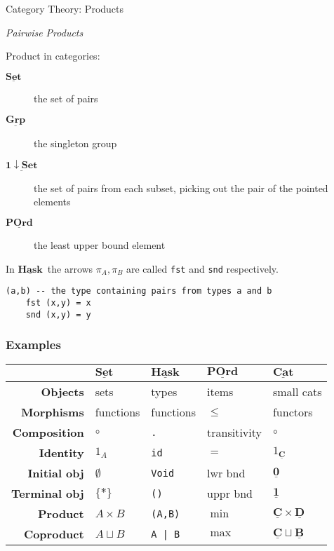 \documentclass[10pt]{beamer}
\newcommand{\Cat}[1]{\ensuremath{\underline{\mathbf{#1}}}}
\theoremstyle{definition}
\theoremstyle{remark}
\numberwithin{equation}{section}
\begin{document}
\begin{frame}[fragile]{Category Theory: Products}

  \emph{Pairwise Products}

  Product in categories:
  \begin{description}
    \item[\Cat{Set}] the set of pairs
    \item[\Cat{Grp}] the singleton group
    \item[\Cat{1\downarrow Set}] the set of pairs from each subset, picking out the pair of the pointed elements
    \item[\Cat{POrd}] the least upper bound element
  \end{description}

  In \Cat{Hask}\ the arrows $\pi_A,\pi_B$ are called \lstinline[columns=fixed]{fst} and \lstinline[columns=fixed]{snd} respectively.

  \begin{lstlisting}[frame=single]
    (a,b) -- the type containing pairs from types a and b
    fst (x,y) = x
    snd (x,y) = y
  \end{lstlisting}

\end{frame}

\begin{frame}[fragile]
  \frametitle{Examples}
  \begin{tabular}{r l l l l}\toprule
    & $\Cat{Set}$ & $\Cat{Hask}$ & $\Cat{POrd}$ & $\Cat{Cat}$ \\\midrule
    \textbf{Objects} & sets & types & items & small cats \\
    \textbf{Morphisms} & functions & functions & $\leq$ & functors \\
    \textbf{Composition} & $\circ$ & \texttt{.} & transitivity & $\circ$ \\
    \textbf{Identity} & $1_A$ & \texttt{id} & $=$ & $1_{\Cat{C}}$ \\
    \textbf{Initial obj\rlap{.}} & $\emptyset$ & \texttt{Void} & lwr bnd & $\Cat{0}$ \\
    \textbf{Terminal obj\rlap{.}} & $\{*\}$ & \texttt{()} & uppr bnd & $\Cat{1}$ \\
    \textbf{Product} & $A \times B$ & \texttt{(A,B)} & $\min$ & $\Cat{C} \times \Cat{D}$ \\
    \textbf{Coproduct} & $A \sqcup B$ & \texttt{A | B} & $\max$ & $\Cat{C} \sqcup \Cat{B}$ \\\bottomrule
  \end{tabular}
\end{frame}
\end{document}
